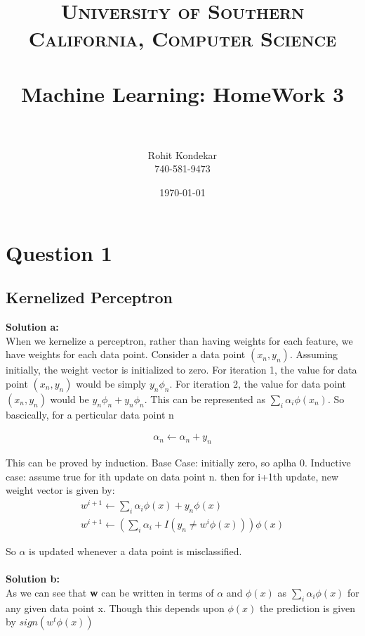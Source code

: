 \documentclass[paper=a4, fontsize=11pt]{scrartcl} %
\title{	
\normalfont \normalsize 
\textsc{University of Southern California, Computer Science} \\ [25pt] %
\horrule{0.5pt} \\[0.4cm] %
\huge Machine Learning: HomeWork 3 \\ %
\horrule{2pt} \\[0.5cm] %
}
\author{Rohit Kondekar\\
740-581-9473} %
\date{\normalsize\today} %
\numberwithin{equation}{section} %
\numberwithin{figure}{section} %
\numberwithin{table}{section} %
\begin{document}
\maketitle %


\section{Question 1}
\subsection{Kernelized Perceptron}


\begingroup
\textbf{Solution a:}\\
When we kernelize a perceptron, rather than having weights for each feature, we have weights for each data point. Consider a data point $(x_{n},y_{n})$. Assuming initially, the weight vector is initialized to zero. For iteration 1, the value for data point $(x_{n},y_{n})$ would be simply $y_{n}\phi_{n}$. For iteration 2, the value for data point $(x_{n},y_{n})$ would be $y_{n}\phi_{n} + y_{n}\phi_{n}$. This can be represented as $\sum_{i}\alpha_{i}\phi(x_{n})$. So bascically, for a perticular data point n

\begin{align*} 
\alpha_{n}\leftarrow \alpha_{n} + y_{n}
\end{align*}

This can be proved by induction. Base Case: initially zero, so aplha 0. Inductive case: assume true for ith update on data point n. then for i+1th update, new weight vector is given by:
\begin{align*} 
w^{i+1}\leftarrow\sum_{i}\alpha_{i}\phi(x) + y_{n}\phi(x) \\
w^{i+1}\leftarrow(\sum_{i}\alpha_{i}+I(y_{n} \neq w^{i}\phi(x)))\phi(x)
\end{align*}

So $\alpha$ is updated whenever a data point is misclassified.\\\\

\textbf{Solution b:}\\
As we can see that \textbf{w} can be written in terms of $\alpha$ and $\phi(x)$ as $\sum_{i}\alpha_{i}\phi(x)$ for any given data point x. Though this depends upon $\phi(x)$ the prediction is given by $sign(w^{t}\phi(x))$
\end{document}
